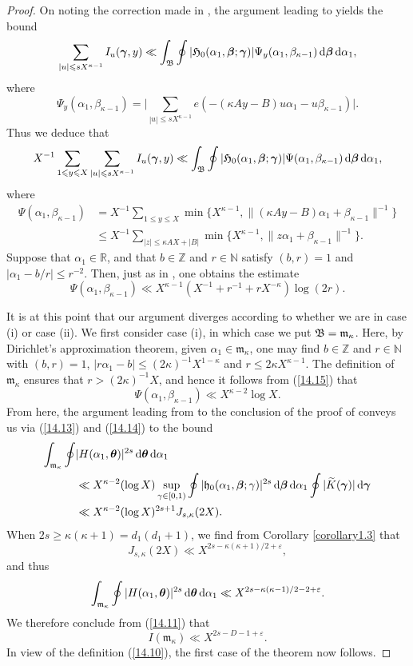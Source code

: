 \documentclass[12pt,reqno]{amsart}
\theoremstyle{definition}
\theoremstyle{remark}
\numberwithin{equation}{section}
\def\dbN{{\mathbb N}} \def\dbO{{\mathbb O}} \def\dbP{{\mathbb P}}
\def\dbR{{\mathbb R}}\def\dbT{{\mathbb T}}
\def\dbZ{{\mathbb Z}}\def\dbQ{{\mathbb Q}}
\def\grh{{\mathfrak h}}\def\grH{{\mathfrak H}}
\def\grm{{\mathfrak m}}\def\grM{{\mathfrak M}}
\def\alp{{\alpha}} \def\bfalp{{\boldsymbol \alpha}}
\def\bet{{\beta}}  \def\bfbet{{\boldsymbol \beta}}
\def\gam{{\gamma}} \def\Gam{{\Gamma}}
\def\bfgam{{\boldsymbol \gam}}
\def\kap{{\kappa}}
\def\eps{\varepsilon}
\def\le{\leqslant} \def\ge{\geqslant} \def\pleq{\preccurlyeq} \def\ple{\prec}
\def\d{{\,{\rm d}}}
\begin{document}
\begin{proof}
\par On noting the correction made in \cite{Woo2015c}, the argument leading to 
\cite[equation (22)]{Woo2012b} yields the bound
$$\sum_{|u|\le sX^{\kap-1}}I_u(\bfgam,y)\ll \int_\grB\oint |\grH_0(\alp_1,\bfbet;\bfgam)|
\Psi_y(\alp_1,\bet_{\kap-1})\d\bfbet \d\alp_1,$$
where
$$\Psi_y(\alp_1,\bet_{\kap-1})=\biggl| \sum_{|u|\le sX^{\kap-1}}e(-(\kap Ay-B)u\alp_1-
u\bet_{\kap-1})\biggr|.$$
Thus we deduce that
\begin{equation}\label{14.14}
X^{-1}\sum_{1\le y\le X}\sum_{|u|\le sX^{\kap-1}}I_u(\bfgam,y)\ll \int_\grB \oint 
|\grH_0(\alp_1,\bfbet;\bfgam)|\Psi(\alp_1,\bet_{\kap-1})\d\bfbet \d\alp_1,
\end{equation}
where
\begin{align*}
\Psi(\alp_1,\bet_{\kap-1})&=X^{-1}\sum_{1\le y\le X}\min \{ X^{\kap-1},
\|(\kap Ay-B)\alp_1+\bet_{\kap-1}\|^{-1}\}\\
&\le X^{-1}\sum_{|z|\le \kap AX+|B|}\min \{ X^{\kap-1},\|z\alp_1 +\bet_{\kap-1}\|^{-1}\}.
\end{align*}
Suppose that $\alp_1\in \dbR$, and that $b\in \dbZ$ and $r\in \dbN$ satisfy $(b,r)=1$ 
and $|\alp_1-b/r|\le r^{-2}$. Then, just as in \cite[equation (23)]{Woo2012b}, one 
obtains the estimate
\begin{equation}\label{14.15}
\Psi(\alp_1,\bet_{\kap-1})\ll X^{\kap-1}(X^{-1}+r^{-1}+rX^{-\kap})\log (2r).
\end{equation}

\par It is at this point that our argument diverges according to whether we are in case (i) 
or case (ii). We first consider case (i), in which case we put $\grB=\grm_\kap$. Here, by 
Dirichlet's approximation theorem, given $\alp_1\in \grm_\kap$, one may find $b\in \dbZ$ 
and $r\in \dbN$ with $(b,r)=1$, $|r\alp_1-b|\le (2\kap)^{-1}X^{1-\kap}$ and 
$r\le 2\kap X^{\kap-1}$. The definition of $\grm_\kap$ ensures that $r>(2\kap)^{-1}X$, 
and hence it follows from (\ref{14.15}) that
$$\Psi(\alp_1,\bet_{\kap-1})\ll X^{\kap-2}\log X.$$
From here, the argument leading from \cite[equation (23)]{Woo2012b} to the conclusion of 
the proof of \cite[Theorem 2.1]{Woo2012b} conveys us via (\ref{14.13}) and (\ref{14.14}) 
to the bound
\begin{align*}
\int_{\grm_\kap}\oint &|H(\alp_1,\bftet)|^{2s}\d\bftet \d\alp_1\\
&\ll X^{\kap-2}(\log X)\sup_{\gam\in [0,1)}\oint |\grh_0(\alp_1,\bfbet;\gam)|^{2s}
\d\bfbet \d\alp_1 \oint |\Ktil(\bfgam)|\d\bfgam \\
&\ll X^{\kap-2}(\log X)^{2s+1}J_{s,\kap}(2X).
\end{align*}
When $2s\ge \kap(\kap+1)=d_1(d_1+1)$, we find from Corollary \ref{corollary1.3} that
$$J_{s,\kap}(2X)\ll X^{2s-\kap(\kap+1)/2+\eps},$$
and thus
$$\int_{\grm_\kap}\oint |H(\alp_1,\bftet)|^{2s}\d\bftet \d\alp_1\ll 
X^{2s-\kap(\kap-1)/2-2+\eps}.$$
We therefore conclude from (\ref{14.11}) that
$$I(\grm_\kap)\ll X^{2s-D-1+\eps}.$$
In view of the definition (\ref{14.10}), the first case of the theorem now follows.\par


\end{proof}
\end{document}

